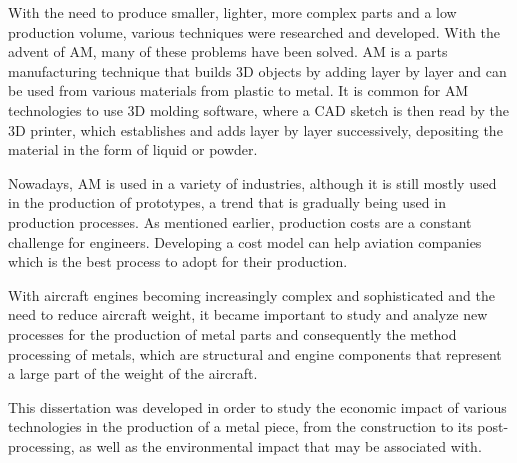 With the need to produce smaller, lighter, more complex parts and a low production volume, various techniques were researched and developed. With the advent of \ac{AM}, many of these problems have been solved. \ac{AM} is a parts manufacturing technique that builds 3D objects by adding layer by layer and can be used from various materials from plastic to metal. It is common for \ac{AM} technologies to use 3D molding software, where a \ac{CAD} sketch is then read by the 3D printer, which establishes and adds layer by layer successively, depositing the material in the form of liquid or powder.\par

Nowadays, \ac{AM} is used in a variety of industries, although it is still mostly used in the production of prototypes, a trend that is gradually being used in production processes. As mentioned earlier, production costs are a constant challenge for engineers. Developing a cost model can help aviation companies which is the best process to adopt for their production. \cite{rejeski2018research}\par

With aircraft engines becoming increasingly complex and sophisticated and the need to reduce aircraft weight, it became important to study and analyze new processes for the production of metal parts and consequently the method processing of metals, which are structural and engine components that represent a large part of the weight of the aircraft.\par 
This dissertation was developed in order to study the economic impact of various technologies in the production of a metal piece, from the construction to its post-processing, as well as the environmental impact that may be associated with. 



